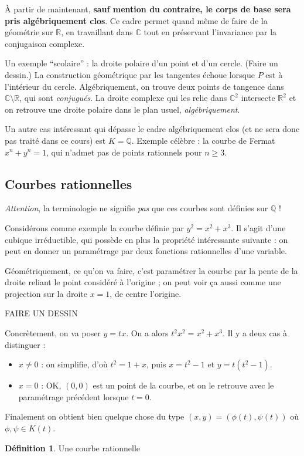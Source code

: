 \documentclass[a4paper, 11pt]{article}
\theoremstyle{definition}
\newtheorem{définition}{Définition}
\newcommand{\real}{\mathbb{R}}
\newcommand{\complex}{\mathbb{C}}
\begin{document}
À partir de maintenant, \textbf{sauf mention du contraire, le corps de
  base sera pris algébriquement clos}. Ce cadre permet quand même de
faire de la géométrie sur $\real$, en travaillant dans $\complex$ tout
en préservant l'invariance par la conjugaison complexe.

Un exemple \enquote{scolaire} : la droite polaire d'un point et d'un
cercle. (Faire un dessin.) La construction géométrique par les
tangentes échoue lorsque $P$ est à l'intérieur du
cercle. Algébriquement, on trouve deux points de tangence dans
$\complex\setminus\real$, qui sont \emph{conjugués}. La droite
complexe qui les relie dans $\complex^2$ intersecte $\real^2$ et on
retrouve une droite polaire dans le plan usuel, \emph{algébriquement}.

Un autre cas intéressant qui dépasse le cadre algébriquement clos (et
ne sera donc pas traité dans ce cours) est $K = \mathbb{Q}$. Exemple
célèbre : la courbe de Fermat $x^n + y^n = 1$, qui n'admet pas de
points rationnels pour $n \geq 3$.

\subsection{Courbes rationnelles}

\emph{Attention}, la terminologie ne signifie \emph{pas} que ces
courbes sont définies sur $\mathbb{Q}$ !

Considérons comme exemple la courbe définie par $y^2 = x^2 + x^3$. Il
s'agit d'une cubique irréductible, qui possède en plus la propriété
intéressante suivante : on peut en donner un paramétrage par deux
fonctions rationnelles d'une variable.

Géométriquement, ce qu'on va faire, c'est paramétrer la courbe par la
pente de la droite reliant le point considéré à l'origine ; on peut
voir ça aussi comme une projection sur la droite $x=1$, de centre
l'origine.

FAIRE UN DESSIN

Concrètement, on va poser $y = tx$. On a alors $t^2 x^2 = x^2 +
x^3$. Il y a deux cas à distinguer :
\begin{itemize}
\item $x \neq 0$ : on simplifie, d'où $t^2 = 1 + x$, puis
  $x = t^2 - 1$ et $y = t(t^2 - 1)$.
\item $x=0$ : OK, $(0,0)$ est un point de la courbe, et on le retrouve
  avec le paramétrage précédent lorsque $t=0$.
\end{itemize}
Finalement on obtient bien quelque chose du type
$(x,y) = (\phi(t), \psi(t))$ où $\phi, \psi \in K(t)$.

\begin{définition}
Une courbe rationnelle  
\end{définition}
\end{document}
